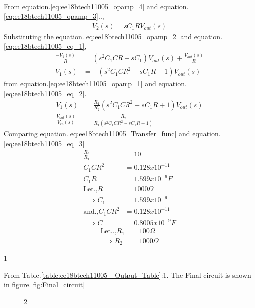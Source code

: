 \begin{enumerate}[label=\arabic*.,ref=\theenumi]
\begin{align}
\end{align}
From equation.\ref{eq:ee18btech11005_opamp_4} and equation. \ref{eq:ee18btech11005_opamp_3}..,
\begin{align}
    V_2(s) = sC_1RV_{out}(s) \label{eq:ee18btech11005_eq_1}
\end{align}
Substituting the equation.\ref{eq:ee18btech11005_opamp_2} and equation.\ref{eq:ee18btech11005_eq_1},
\begin{align}
    \frac{-V_1(s)}{R} &= (s^2C_1CR + sC_1)V_{out}(s) +\frac{V_{out}(s)}{R}\\
    V_1(s) &= -(s^2C_1CR^2+sC_1R+1)V_{out}(s)\label{eq:ee18btech11005_eq_2}
\end{align}
from equation.\ref{eq:ee18btech11005_opamp_1} and equation.\ref{eq:ee18btech11005_eq_2}.
\begin{align}
     V_1(s) &= \frac{R_1}{R_2}(s^2C_1CR^2+sC_1R+1)V_{out}(s)\\
    \frac{V_{out}(s)}{V_{in}(s)} &= \frac{R_2}{R_1(s^2C_1CR^2+sC_1R+1)} \label{eq:ee18btech11005_eq_3}
\end{align}
Comparing equation.\ref{eq:ee18btech11005_Transfer_func} and equation.\ref{eq:ee18btech11005_eq_3}
\begin{align}
    \frac{R_2}{R_1} &= 10 \\
    C_1CR^2 &= 0.128x10^{-11} \\
    C_1R &= 1.599x10^{-6} F\\
\text{Let.,} R &= 1000 \Omega\\
\implies C_1 &= 1.599x10^{-9} \\
 \text{and.,} C_1CR^2 &= 0.128x10^{-11} \\
 \implies C &= 0.8005x10^{-9} F
\end{align}
\begin{align}
\text{Let..,} R_1 &= 100\Omega\\
\implies R_2 &= 1000\Omega
\end{align}
\begin{table}[!ht]
\centering

\caption{1}
\label{table:ee18btech11005_ Output_Table}
\end{table}
From Table.\ref{table:ee18btech11005_ Output_Table}:1. The Final circuit is shown in figure.\ref{fig:Final_circuit}
\begin{figure}[!hbt]
	\begin{center}
			\resizebox{\columnwidth}{!}{}
	\end{center}
\caption{2}

\end{figure}
\end{enumerate}
